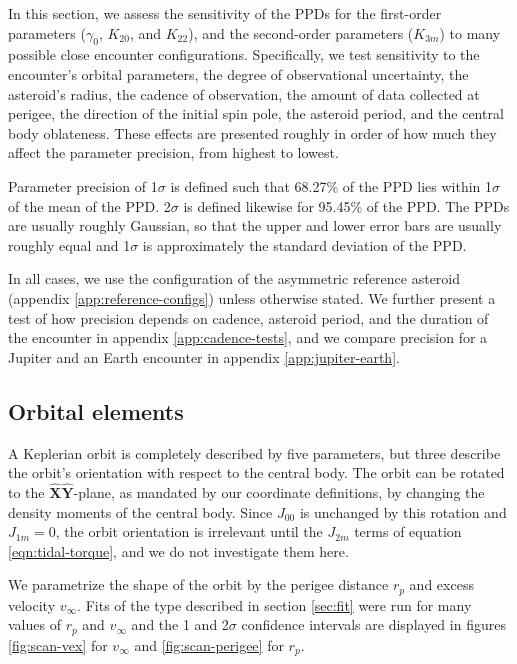 \documentclass[fleqn,usenatbib]{mnras}
\newcommand{\unit}[1]{\bm{\hat{#1}}}
\begin{document}
In this section, we assess the sensitivity of the PPDs for the first-order parameters ($\gamma_0$, $K_{20}$, and $K_{22}$), and the second-order parameters ($K_{3m}$) to many possible close encounter configurations. Specifically, we test sensitivity to the encounter's orbital parameters, the degree of observational uncertainty, the asteroid's radius, the cadence of observation, the amount of data collected at perigee, the direction of the initial spin pole, the asteroid period, and the central body oblateness. These effects are presented roughly in order of how much they affect the parameter precision, from highest to lowest.

Parameter precision of 1$\sigma$ is defined such that 68.27\% of the PPD lies within 1$\sigma$ of the mean of the PPD. 2$\sigma$ is defined likewise for 95.45\% of the PPD. The PPDs are usually roughly Gaussian, so that the upper and lower error bars are usually roughly equal and 1$\sigma$ is approximately the standard deviation of the PPD.

In all cases, we use the configuration of the asymmetric reference asteroid (appendix \ref{app:reference-configs}) unless otherwise stated. We further present a test of how precision depends on cadence, asteroid period, and the duration of the encounter in appendix \ref{app:cadence-tests}, and we compare precision for a Jupiter and an Earth encounter in appendix \ref{app:jupiter-earth}.


\subsection{Orbital elements}
\label{sec:scan-orbit}
A Keplerian orbit is completely described by five parameters, but three describe the orbit's orientation with respect to the central body. The orbit can be rotated to the $\unit X \unit Y$-plane, as mandated by our coordinate definitions, by changing the density moments of the central body. Since $J_{00}$ is unchanged by this rotation and $J_{1m}=0$, the orbit orientation is irrelevant until the $J_{2m}$ terms of equation \ref{eqn:tidal-torque}, and we do not investigate them here.

We parametrize the shape of the orbit by the perigee distance $r_p$ and excess velocity $v_\infty$. Fits of the type described in section \ref{sec:fit} were run for many values of $r_p$ and $v_\infty$ and the 1 and 2$\sigma$ confidence intervals are displayed in figures \ref{fig:scan-vex} for $v_\infty$ and \ref{fig:scan-perigee} for $r_p$.
\end{document}
